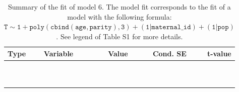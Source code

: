 \begin{table}[H]

\caption{\label{tab:tab6}Summary of the fit of model 6. The model fit corresponds to the fit of a model with the following formula: {\small$\mathtt{T \sim 1 + poly(cbind(age, parity), 3) + (1 | maternal\_id) + (1 | pop)}$}. See legend of Table S1 for more details.}
\centering
\fontsize{8}{10}\selectfont
\begin{tabular}[t]{>{\raggedright\arraybackslash}p{3cm}>{\raggedright\arraybackslash}p{5cm}rrr}
\toprule
Type & Variable & Value & Cond. SE & t-value\\
\midrule
\cellcolor{gray!6}{fixed effects} & \cellcolor{gray!6}{$\beta_1$} & \cellcolor{gray!6}{-4.1} & \cellcolor{gray!6}{0.113} & \cellcolor{gray!6}{-36.4}\\
\cellcolor{gray!6}{} & \cellcolor{gray!6}{$\beta_{\mathtt{age}}$} & \cellcolor{gray!6}{73.7} & \cellcolor{gray!6}{31.1} & \cellcolor{gray!6}{2.37}\\
\cellcolor{gray!6}{} & \cellcolor{gray!6}{$\beta_{\mathtt{age}^2}$} & \cellcolor{gray!6}{-61.2} & \cellcolor{gray!6}{17.2} & \cellcolor{gray!6}{-3.55}\\
\cellcolor{gray!6}{} & \cellcolor{gray!6}{$\beta_{\mathtt{age}^3}$} & \cellcolor{gray!6}{-47.1} & \cellcolor{gray!6}{16.4} & \cellcolor{gray!6}{-2.87}\\
\cellcolor{gray!6}{} & \cellcolor{gray!6}{$\beta_{\mathtt{parity}}$} & \cellcolor{gray!6}{-0.936} & \cellcolor{gray!6}{40.1} & \cellcolor{gray!6}{-0.0233}\\
\cellcolor{gray!6}{} & \cellcolor{gray!6}{$\beta_{\mathtt{age}\times\mathtt{parity}}$} & \cellcolor{gray!6}{-4006} & \cellcolor{gray!6}{11890} & \cellcolor{gray!6}{-0.337}\\
\cellcolor{gray!6}{} & \cellcolor{gray!6}{$\beta_{\mathtt{age}^2\times\mathtt{parity}}$} & \cellcolor{gray!6}{7710} & \cellcolor{gray!6}{8669} & \cellcolor{gray!6}{0.889}\\
\cellcolor{gray!6}{} & \cellcolor{gray!6}{$\beta_{\mathtt{parity}^2}$} & \cellcolor{gray!6}{19} & \cellcolor{gray!6}{27.3} & \cellcolor{gray!6}{0.694}\\
\cellcolor{gray!6}{} & \cellcolor{gray!6}{$\beta_{\mathtt{age}\times\mathtt{parity}^2}$} & \cellcolor{gray!6}{-4380} & \cellcolor{gray!6}{8121} & \cellcolor{gray!6}{-0.539}\\
\cellcolor{gray!6}{} & \cellcolor{gray!6}{$\beta_{\mathtt{parity}^3}$} & \cellcolor{gray!6}{-18.6} & \cellcolor{gray!6}{14.1} & \cellcolor{gray!6}{-1.32}\\

\end{tabular}
\end{table}
